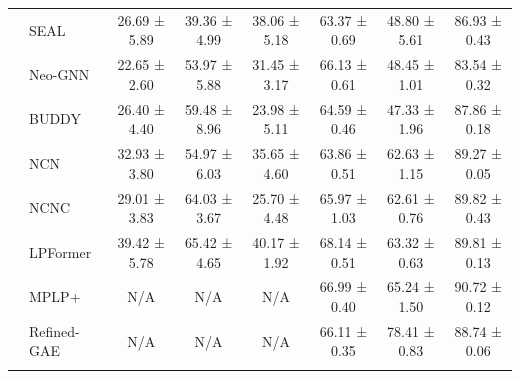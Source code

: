 \documentclass{article}
\newcommand{\catdot}[1]{%
  \tikz[baseline={(mark.base)}]{\node[circle, draw=black, line width=0.25pt, fill=#1, inner sep=2pt] (mark) {};}%
}
\theoremstyle{plain}
\theoremstyle{definition}
\theoremstyle{remark}
\begin{document}
\begin{table}[t]
{\begin{tabular}{@{}clcccccc@{}}
             & SEAL                       & 26.69 ± 5.89                        & 39.36 ± 4.99                        & 38.06 ± 5.18                        & 63.37 ± 0.69                        & 48.80 ± 5.61                        & 86.93 ± 0.43                        \\
             & Neo-GNN                    & 22.65 ± 2.60                        & 53.97 ± 5.88                        & 31.45 ± 3.17                        & 66.13 ± 0.61                        & 48.45 ± 1.01                        & 83.54 ± 0.32                        \\
             & BUDDY                      & 26.40 ± 4.40                        & {\color{thirdbest} 59.48 ± 8.96}    & 23.98 ± 5.11                        & 64.59 ± 0.46                        & 47.33 ± 1.96                        & 87.86 ± 0.18                        \\
             & NCN                        & 32.93 ± 3.80                        & 54.97 ± 6.03                        & 35.65 ± 4.60                        & 63.86 ± 0.51                        & 62.63 ± 1.15                        & 89.27 ± 0.05                        \\
             & NCNC                       & 29.01 ± 3.83                        & {\color{secondbest} 64.03 ± 3.67}   & 25.70 ± 4.48                        & 65.97 ± 1.03                        & 62.61 ± 0.76                        & {\color{secondbest} 89.82 ± 0.43}   \\
             & LPFormer                   & {\color{secondbest} 39.42 ± 5.78}   & {\color{firstbest} 65.42 ± 4.65}    & {\color{secondbest} 40.17 ± 1.92}   & {\color{firstbest} 68.14 ± 0.51}    & 63.32 ± 0.63                        & {\color{thirdbest} 89.81 ± 0.13}    \\ \midrule
    \multirow{2}{*}{\raisebox{0.75ex}{\catdot{catorange}}} 
             & MPLP+                      & N/A                                 & N/A                                 & N/A                                 & {\color{secondbest} 66.99 ± 0.40}   & 65.24 ± 1.50                        & {\color{firstbest} 90.72 ± 0.12}    \\
             & Refined-GAE                & N/A                                 & N/A                                 & N/A                                 & 66.11 ± 0.35                        & {\color{secondbest} 78.41 ± 0.83}   & 88.74 ± 0.06                        \\ \midrule
    \multirow{5}{*}{\raisebox{0.75ex}{\catdot{catred}}}

\end{tabular}}
\end{table}
\end{document}
